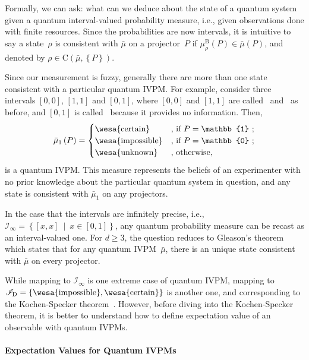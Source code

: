 \documentclass[english,reprint, aps, prl,superscriptaddress, showpacs,
showkeys, longbibliography, amsmath, amssymb]{revtex4-1}
\theoremstyle{plain}
\theoremstyle{definition}
\newcommand{\imposs}{{\text{\wesa{impossible}}}}
\newcommand{\necess}{{\text{\wesa{certain}}}}
\newcommand{\unknown}{{\text{\wesa{unknown}}}}
\newcommand{\set}[2]{\ensuremath{\left\{ {#1}~\middle|~{#2}\right\} }}
\newcommand{\coreBorn}{\ensuremath{\mathrm{C}}}
\begin{document}
Formally, we can ask: what can we deduce about the state of a quantum
system given a quantum interval-valued probability measure, i.e.,
given observations done with finite resources. Since the probabilities
are now intervals, it is intuitive to say a state~$\rho$ is consistent
with $\bar{\mu}$ on a projector~$P$ if $\mu_{\rho}^{\mathrm{B}}\left(P\right)\in\bar{\mu}\left(P\right)$,
and denoted by $\rho\in\coreBorn\left(\bar{\mu},\left\{ P\right\} \right)$.

Since our measurement is fuzzy, generally there are more than one
state consistent with a particular quantum IVPM. For example, consider
three intervals $\left[0,0\right]$, $\left[1,1\right]$ and \emph{$\left[0,1\right]$},
where $\left[0,0\right]$ and $\left[1,1\right]$ are called \imposs~and
\necess~as before, and \emph{$\left[0,1\right]$} is called \unknown~because
it provides no information. Then,
\begin{equation}
\bar{\mu}_{1}\left(P\right)=\begin{cases}
\necess & \text{, if }P=\mathbb{1}\text{ ;}\\
\imposs & \text{, if }P=\mathbb{0}\text{ ;}\\
\unknown & \text{, otherwise,}
\end{cases}\label{eq:homomorphism-1}
\end{equation}
is a quantum IVPM. This measure represents the beliefs of an experimenter
with no prior knowledge about the particular quantum system in question,
and any state is consistent with $\bar{\mu}_{1}$ on any projectors.

In the case that the intervals are infinitely precise, i.e., $\mathscr{I}_{\infty}=\set{\left[x,x\right]}{x\in\left[0,1\right]}$,
any quantum probability measure can be recast as an interval-valued
one. For $d\ge3$, the question reduces to Gleason's theorem which
states that for any quantum IVPM~$\bar{\mu}$, there is an unique
state consistent with $\bar{\mu}$ on every projector.

While mapping to $\mathscr{I}_{\infty}$ is one extreme case of quantum
IVPM, mapping to $\mathscr{I}_{\mathrm{D}}=\left\{ \imposs,\necess\right\} $
is another one, and corresponding to the Kochen-Specker theorem~\cite{kochenspecker1967,peres1995quantum,Redhead1987-REDINA,Griffiths2003}.
However, before diving into the Kochen-Specker theorem, it is better
to understand how to define expectation value of an observable with
quantum IVPMs.

\paragraph{Expectation Values for Quantum IVPMs}
\end{document}
